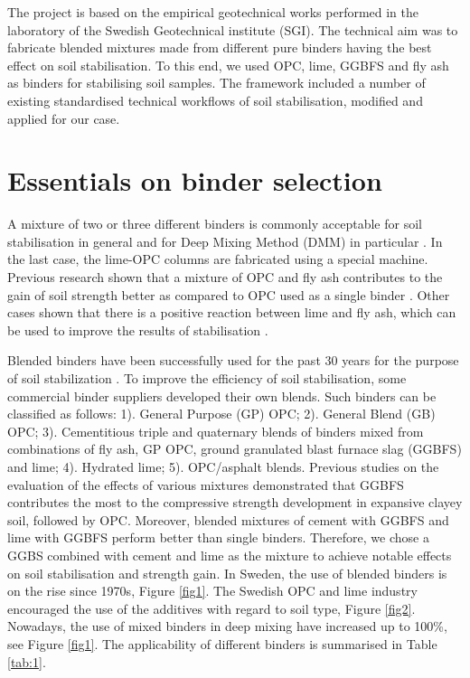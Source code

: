 \documentclass[eprint,
]{actapoly}
\begin{document}
The project is based on the empirical geotechnical works performed in the laboratory of the Swedish Geotechnical institute (SGI). The technical aim was to fabricate blended mixtures made from different pure binders having the best effect on soil stabilisation. To this end, we used OPC, lime, GGBFS and fly ash as binders for stabilising soil samples. The framework included a number of existing standardised technical workflows of soil stabilisation, modified and applied for our case.

\section{Essentials on binder selection}
A mixture of two or three different binders is commonly acceptable for soil stabilisation in general and for Deep Mixing Method (DMM) in particular \cite{BergmanLarsson,Naqshabandy,Paniagua}. In the last case, the lime-OPC columns are fabricated using a special machine. Previous research shown that a mixture of OPC and fly ash contributes to the gain of soil strength better as compared to OPC used as a single binder \cite{Yaxuetal2022,Vukicevicetal}. Other cases shown that there is a positive reaction between lime and fly ash, which can be used to improve the results of stabilisation \cite{GoswamiSingh,Raoetal2008,Knapiketal2015}. 

Blended binders have been successfully used for the past 30 years for the purpose of soil stabilization \cite{Ghazy,Consolietal2019,Lindh2001,Leeetal2019,Filho,Yietal2014,LindhLemenkovaECES,Guetal2014,Yangetal2015}. To improve the efficiency of soil stabilisation, some commercial binder suppliers developed their own blends. Such binders can be classified as follows: 1). General Purpose (GP) OPC; 2). General Blend (GB) OPC; 3). Cementitious triple and quaternary blends of binders mixed from combinations of fly ash, GP OPC, ground granulated blast furnace slag (GGBFS) and lime; 4). Hydrated lime; 5). OPC/asphalt blends. Previous studies on the evaluation of the effects of various mixtures demonstrated \cite{ma15217798} that GGBFS contributes the most to the compressive strength development in expansive clayey soil, followed by OPC. Moreover, blended mixtures of cement with GGBFS and lime with GGBFS perform better than single binders. Therefore, we chose a GGBS combined with cement and lime as the mixture to achieve notable effects on soil stabilisation and strength gain. In Sweden, the use of blended binders is on the rise since 1970s, Figure \ref{fig1}. The Swedish OPC and lime industry encouraged the use of the additives with regard to soil type, Figure \ref{fig2}. Nowadays, the use of mixed binders in deep mixing have increased up to 100\%, see Figure \ref{fig1}. The applicability of different binders is summarised in Table \ref{tab:1}. 
\end{document}
